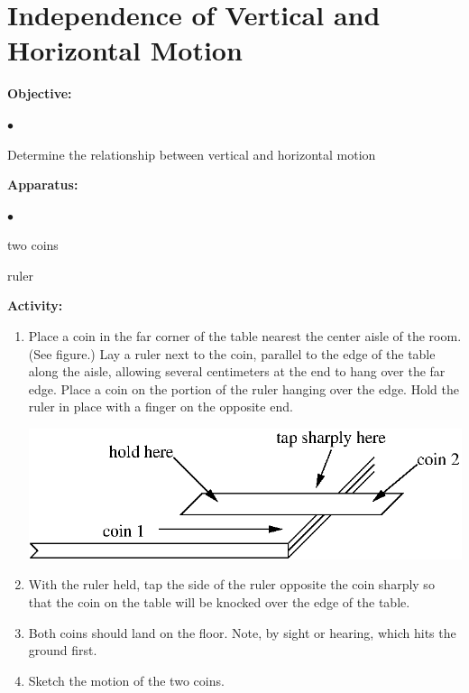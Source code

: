 
\section{Independence of Vertical and Horizontal Motion}

\makelabheader %

{\noindent \bf Objective:} \begin{list}{$\bullet$}{\itemsep0pt }

\item Determine the relationship between vertical and horizontal motion

\end{list}

{\noindent \bf Apparatus:} \begin{list}{$\bullet$}{\itemsep0pt }

\item two coins \item ruler

\end{list}

{\noindent \bf Activity:} \begin{enumerate}

\item Place a coin in the far corner of the table nearest the center aisle of the room. (See figure.) Lay a ruler next to the coin, parallel to the edge of the table along the aisle, allowing several centimeters at the end to hang over the far edge. Place a coin on the portion of the ruler hanging over the edge. Hold the ruler in place with a finger on the opposite end.

\vspace{0.3cm}
{\par\centering \includegraphics{independence/independence_fig1.eps} \par}
\vspace{0.3cm}

\item With the ruler held, tap the side of the ruler opposite the coin sharply so that the coin on the table will be knocked over the edge of the table.

\item Both coins should land on the floor. Note, by sight or hearing, which hits the ground first.

\item Sketch the motion of the two coins.

\end{enumerate}

